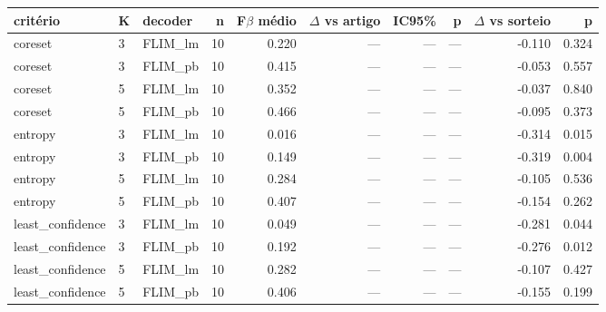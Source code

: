 \begin{tabular}{lllrrrrrrr}
\hline
critério & K & decoder & n & F$\beta$ médio & $\Delta$ vs artigo & IC95\% & p & $\Delta$ vs sorteio & p  \\
\hline
coreset & 3 & FLIM\_lm & 10 & 0.220 & --- & --- & --- & -0.110 & 0.324 \\
coreset & 3 & FLIM\_pb & 10 & 0.415 & --- & --- & --- & -0.053 & 0.557 \\
coreset & 5 & FLIM\_lm & 10 & 0.352 & --- & --- & --- & -0.037 & 0.840 \\
coreset & 5 & FLIM\_pb & 10 & 0.466 & --- & --- & --- & -0.095 & 0.373 \\
entropy & 3 & FLIM\_lm & 10 & 0.016 & --- & --- & --- & -0.314 & 0.015 \\
entropy & 3 & FLIM\_pb & 10 & 0.149 & --- & --- & --- & -0.319 & 0.004 \\
entropy & 5 & FLIM\_lm & 10 & 0.284 & --- & --- & --- & -0.105 & 0.536 \\
entropy & 5 & FLIM\_pb & 10 & 0.407 & --- & --- & --- & -0.154 & 0.262 \\
least\_confidence & 3 & FLIM\_lm & 10 & 0.049 & --- & --- & --- & -0.281 & 0.044 \\
least\_confidence & 3 & FLIM\_pb & 10 & 0.192 & --- & --- & --- & -0.276 & 0.012 \\
least\_confidence & 5 & FLIM\_lm & 10 & 0.282 & --- & --- & --- & -0.107 & 0.427 \\
least\_confidence & 5 & FLIM\_pb & 10 & 0.406 & --- & --- & --- & -0.155 & 0.199 \\
\hline
\end{tabular}
